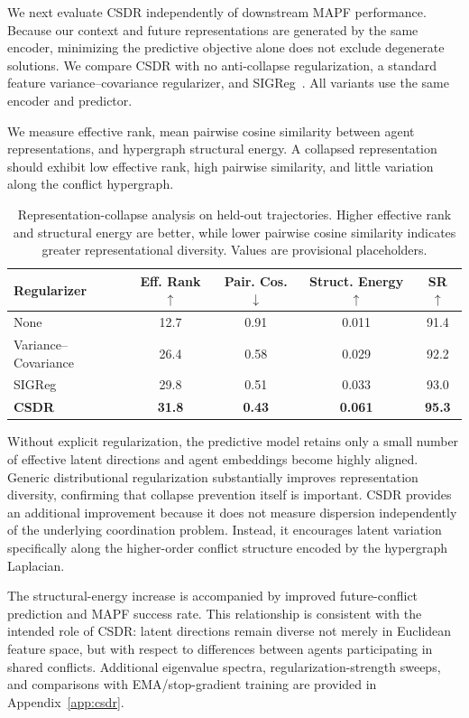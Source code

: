 \documentclass{article} %
\begin{document}
We next evaluate CSDR independently of downstream MAPF performance. Because our context and future representations are generated by the same encoder, minimizing the predictive objective alone does not exclude degenerate solutions. We compare CSDR with no anti-collapse regularization, a standard feature variance--covariance regularizer, and SIGReg~\cite{balestriero2025lejepa}. All variants use the same encoder and predictor.

We measure effective rank, mean pairwise cosine similarity between agent representations, and hypergraph structural energy. A collapsed representation should exhibit low effective rank, high pairwise similarity, and little variation along the conflict hypergraph.

\begin{table}[t]
\centering
\caption{Representation-collapse analysis on held-out trajectories. Higher effective rank and structural energy are better, while lower pairwise cosine similarity indicates greater representational diversity. Values are provisional placeholders.}
\label{tab:csdr}
\small
\setlength{\tabcolsep}{4.5pt}
\begin{tabular}{lcccc}
\toprule
Regularizer
& Eff. Rank $\uparrow$
& Pair. Cos. $\downarrow$
& Struct. Energy $\uparrow$
& SR $\uparrow$ \\
\midrule
None
    & 12.7 & 0.91 & 0.011 & 91.4 \\
Variance--Covariance
    & 26.4 & 0.58 & 0.029 & 92.2 \\
SIGReg~\cite{balestriero2025lejepa}
    & 29.8 & 0.51 & 0.033 & 93.0 \\
\textbf{CSDR}
    & \textbf{31.8}
    & \textbf{0.43}
    & \textbf{0.061}
    & \textbf{95.3} \\
\bottomrule
\end{tabular}
\end{table}

Without explicit regularization, the predictive model retains only a small number of effective latent directions and agent embeddings become highly aligned. Generic distributional regularization substantially improves representation diversity, confirming that collapse prevention itself is important. CSDR provides an additional improvement because it does not measure dispersion independently of the underlying coordination problem. Instead, it encourages latent variation specifically along the higher-order conflict structure encoded by the hypergraph Laplacian.

The structural-energy increase is accompanied by improved future-conflict prediction and MAPF success rate. This relationship is consistent with the intended role of CSDR: latent directions remain diverse not merely in Euclidean feature space, but with respect to differences between agents participating in shared conflicts. Additional eigenvalue spectra, regularization-strength sweeps, and comparisons with EMA/stop-gradient training are provided in Appendix~\ref{app:csdr}.
\end{document}
